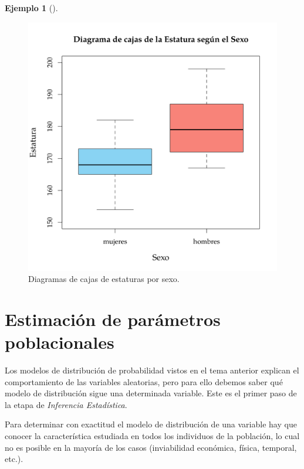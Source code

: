 \documentclass[
  a4paper,
]{scrreport}
\theoremstyle{definition}
\theoremstyle{definition}
\newtheorem{example}{Ejemplo}[chapter]
\theoremstyle{plain}
\theoremstyle{remark}
\begin{document}
\begin{example}[]
\begin{figure}
{\centering \includegraphics{img/descriptiva/diagrama_caja_estatura_sexo.png}

}

\caption{Diagramas de cajas de estaturas por sexo.}

\end{figure}

\end{example}


\hypertarget{estimaciuxf3n-de-paruxe1metros-poblacionales}{%
\chapter{Estimación de parámetros
poblacionales}\label{estimaciuxf3n-de-paruxe1metros-poblacionales}}

Los modelos de distribución de probabilidad vistos en el tema anterior
explican el comportamiento de las variables aleatorias, pero para ello
debemos saber qué modelo de distribución sigue una determinada variable.
Este es el primer paso de la etapa de \emph{Inferencia Estadística}.

Para determinar con exactitud el modelo de distribución de una variable
hay que conocer la característica estudiada en todos los individuos de
la población, lo cual no es posible en la mayoría de los casos
(inviabilidad económica, física, temporal, etc.).
\end{document}
